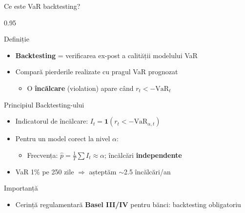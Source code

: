 \documentclass[9pt, aspectratio=169, t]{beamer}
\begin{document}
\begin{frame}{Ce este VaR backtesting?}
    \small
    \begin{cminipage}{0.95\textwidth}
        \begin{block}{Definiție}
            \begin{itemize}\setlength{\itemsep}{0pt}
                \item \textbf{Backtesting} = verificarea ex-post a calității modelului VaR
                \item Compară pierderile realizate cu pragul VaR prognozat
                    \begin{itemize}\setlength{\itemsep}{0pt}
                        \item O \textbf{încălcare} (violation) apare când $r_t < -\text{VaR}_t$
                    \end{itemize}
            \end{itemize}
        \end{block}
        \vspace{-0.2cm}
        \begin{block}{Principiul Backtesting-ului}
            \begin{itemize}\setlength{\itemsep}{0pt}
                \item Indicatorul de încălcare: $I_t = \mathbf{1}(r_t < -\text{VaR}_{\alpha,t})$
                \item Pentru un model corect la nivel $\alpha$:
                    \begin{itemize}\setlength{\itemsep}{0pt}
                        \item Frecvența: $\hat{p} = \frac{1}{T}\sum I_t \approx \alpha$; încălcări \textbf{independente}
                    \end{itemize}
                \item VaR 1\% pe 250 zile $\Rightarrow$ așteptăm $\sim$2.5 încălcări/an
            \end{itemize}
        \end{block}
        \vspace{-0.2cm}
        \begin{alertblock}{Importanță}
            \begin{itemize}\setlength{\itemsep}{0pt}
                \item Cerință regulamentară \textbf{Basel III/IV} pentru bănci: backtesting obligatoriu
            \end{itemize}
        \end{alertblock}
    \end{cminipage}
\end{frame}
\end{document}
